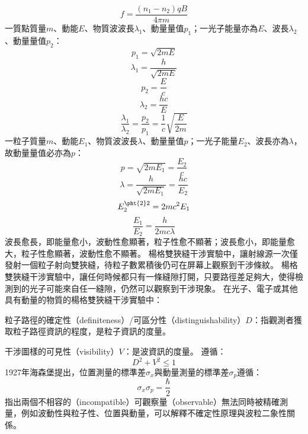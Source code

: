 \documentclass[a4paper,12pt]{article}
\begin{document}
\[f=\frac{(n_1-n_2)qB}{4\pi m}\]
一質點質量$m$、動能$E$、物質波波長$\lambda_1$、動量量值$p_1$；一光子能量亦為$E$、波長$\lambda_2$、動量量值$p_2$：
\[p_1=\sqrt{2mE}\]
\[\lambda_1=\frac{h}{\sqrt{2mE}}\]
\[p_2=\frac{E}{c}\]
\[\lambda_2=\frac{hc}{E}\]
\[\frac{\lambda_1}{\lambda_2}=\frac{p_2}{p_1}=\frac{1}{c}\sqrt{\frac{E}{2m}}\]
一粒子質量$m$、動能$E_1$、物質波波長$\lambda$、動量量值$p$；一光子能量$E_2$、波長亦為$\lambda$，故動量量值必亦為$p$：
\[p=\sqrt{2mE_1}=\frac{E_2}{c}\]
\[\lambda=\frac{h}{\sqrt{2mE_1}}=\frac{hc}{E_2}\]
\[E_2^{\pht{2}2}=2mc^2E_1\]
\[\frac{E_1}{E_2}=\frac{h}{2mc\lambda}\]
波長愈長，即能量愈小，波動性愈顯著，粒子性愈不顯著；波長愈小，即能量愈大，粒子性愈顯著，波動性愈不顯著。
楊格雙狹縫干涉實驗中，讓射線源一次僅發射一個粒子射向雙狹縫，待粒子數累積後仍可在屏幕上觀察到干涉條紋。
楊格雙狹縫干涉實驗中，讓任何時候都只有一條縫隙打開，只要路徑差足夠大，使得檢測到的光子可能來自任一縫隙，仍然可以觀察到干涉現象。
在光子、電子或其他具有動量的物質的楊格雙狹縫干涉實驗中：
\bit
\item 粒子路徑的確定性（definiteness）/可區分性（distinguishability）$D$：指觀測者獲取粒子路徑資訊的程度，是粒子資訊的度量。
\item 干涉圖樣的可見性（visibility）$V$：是波資訊的度量。
\eit
遵循：
\[D^2+V^2\leq 1\]
1927年海森堡提出，位置測量的標準差$\sigma_x$與動量測量的標準差$\sigma_p$遵循：
\[\sigma_x\sigma_p=\frac{\hbar}{2}\]
指出兩個不相容的（incompatible）可觀察量（observable）無法同時被精確測量，例如波動性與粒子性、位置與動量，可以解釋不確定性原理與波粒二象性關係。
\end{document}
